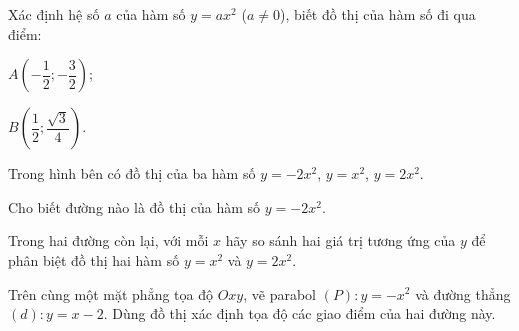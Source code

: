 \begin{practice}
\begin{questions}[series=SBT]
        \item Xác định hệ số $a$ của hàm số $y=ax^2$ ($a\ne0$), biết đồ thị của hàm số đi qua điểm:
        \begin{questions}
            \item $A\left(-\dfrac{1}{2};-\dfrac{3}{2}\right)$;
            \item $B\left(\dfrac{1}{2};\dfrac{\sqrt{3}}{4}\right)$.
        \end{questions}
        \answerline
        \answerline

        \item Trong hình bên có đồ thị của ba hàm số $y=-2x^2$, $y=x^2$, $y=2x^2$.
        \begin{questions}
            \item Cho biết đường nào là đồ thị của hàm số $y=-2x^2$.
            \item Trong hai đường còn lại, với mỗi $x$ hãy so sánh hai giá trị tương ứng của $y$ để phân biệt đồ thị hai hàm số $y=x^2$ và $y=2x^2$.
        \end{questions}

        \begin{center}
        \end{center}

        \answerline
        \answerline

        \item Trên cùng một mặt phẳng tọa độ $Oxy$, vẽ parabol $(P):y=-x^2$ và đường thẳng $(d):y=x-2$. Dùng đồ thị xác định tọa độ các giao điểm của hai đường này.
        \answerline
        \answerline
        \answerline


\end{questions}
\end{practice}
